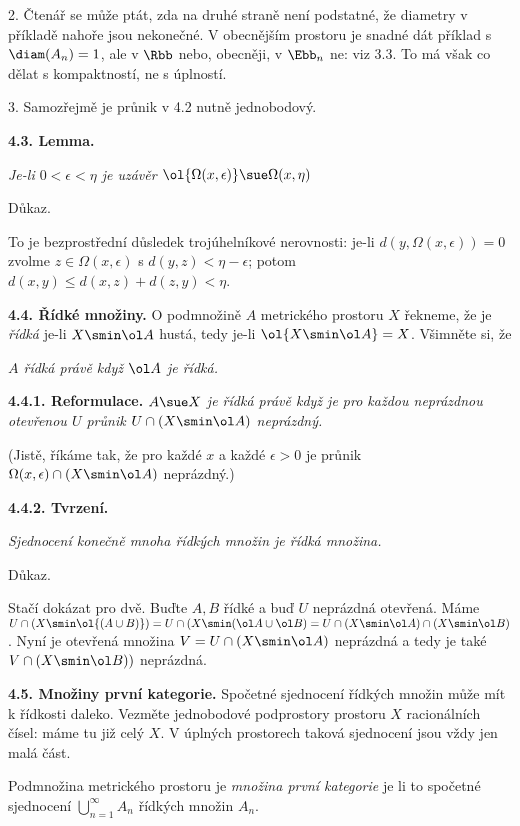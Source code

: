 \documentclass[12pt]{article}
\begin{document}
2. Čtenář se může ptát, zda na druhé straně není podstatné, že diametry v příkladě nahoře jsou nekonečné. V obecnějším prostoru je snadné dát příklad s $\diam(A_n)=1$, ale v $\Rbb$ nebo, obecněji, v
$\Ebb_n$ ne: viz 3.3. To má však co dělat s kompaktností, ne s úplností.

3. Samozřejmě je průnik v 4.2 nutně jednobodový.

\bigskip

{\bf 4.3. Lemma.} {\em Je-li $0<\epsilon<\eta$ je uzávěr $\ol{\Omega(x,\epsilon)}\sue\Omega(x,\eta)$

Důkaz.} To je bezprostřední důsledek trojúhelníkové nerovnosti: je-li
$d(y,\Omega(x,\epsilon))=0$ zvolme $z\in\Omega(x,\epsilon)$ s $d(y,z)<\eta-\epsilon$; potom $d(x,y)\leq d(x,z)+d(z,y)<\eta$.\sq

\bigskip

{\bf 4.4. Řídké množiny.} O podmnožině $A$ metrického prostoru  $X$ řekneme, že je  {\em řídká} je-li $X\smin\ol A$ hustá, tedy je-li
$\ol{X\smin\ol A}=X$. Všimněte si, že

\smallskip

\centerline{\em $A$ řídká právě když $\ol A$ je řídká.}

\medskip

{\bf 4.4.1. Reformulace.} {\em $A\sue X$ je řídká právě kdy\v z je pro každou neprázdnou otevřenou $U$ průnik $U\cap(X\smin\ol A)$ neprázdný.}

(Jistě, říkáme tak, že pro každé $x$ a každé $\epsilon>0$ je
průnik $\Omega(x,\epsilon)\cap(X\smin\ol A)$ neprázdný.)

\medskip

{\bf 4.4.2. Tvrzení.} {\em Sjednocení konečně mnoha řídkých množin
je řídká množina.

Důkaz.} Stačí dokázat pro dvě. Buďte $A,B$ řídké a buď $U$ neprázdná otevřená. Máme $U\cap(X\smin\ol{(A\cup B)})=U\cap(X\smin(\ol A\cup\ol B)=U\cap(X\smin\ol A)\cap(X\smin\ol B)$. 
Nyní je otevřená množina $V=U\cap(X\smin\ol A)$ neprázdná a tedy je také
$V\cap(X\smin\ol B))$ neprázdná. \sq

\bigskip

{\bf 4.5. Množiny první kategorie.} Spočetné sjednocení řídkých množin může mít k řídkosti daleko. Vezměte jednobodové podprostory prostoru $X$  racionálních čísel: máme tu již celý $X$. V úplných prostorech taková sjednocení jsou vždy jen malá část.

\medskip

Podmnožina metrického prostoru je {\em množina první kategorie} je li to spočetné sjednocení $\bigcup_{n=1}^\infty A_n$ řídkých množin $A_n$.
\end{document}
